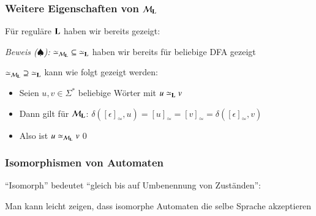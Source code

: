 \documentclass[aspectratio=1610,onlymath]{beamer}
\begin{document}
\begin{frame}[t]\frametitle{Weitere Eigenschaften von $\mathcal{M}_{\textbf{\textcolor{black}{L}}}$}

Für reguläre $\textbf{\textcolor{black}{L}}$ haben wir bereits gezeigt:
%
\medskip\pause

\emph{Beweis ($\spadesuit$):} ${\simeq_{\mathcal{M}_{\textbf{\textcolor{black}{L}}}}}\subseteq{\simeq_{\textbf{\textcolor{black}{L}}}}$ haben wir bereits für beliebige DFA gezeigt
\medskip

${\simeq_{\mathcal{M}_{\textbf{\textcolor{black}{L}}}}}\supseteq{\simeq_{\textbf{\textcolor{black}{L}}}}$ kann wie folgt gezeigt werden:
\begin{itemize}
\item Seien $u,v\in\Sigma^*$ beliebige Wörter mit $u\simeq_{\textbf{\textcolor{black}{L}}} v$
\item Dann gilt für $\mathcal{M}_{\textbf{\textcolor{black}{L}}}$: $\delta([\epsilon]_\simeq,u)=[u]_\simeq=[v]_\simeq=\delta([\epsilon]_\simeq,v)$
\item Also ist $u\simeq_{\mathcal{M}_{\textbf{\textcolor{black}{L}}}} v$\qed
\end{itemize}

\end{frame}

\begin{frame}\frametitle{Isomorphismen von Automaten}

"`Isomorph"' bedeutet "`gleich bis auf Umbenennung von Zuständen"':\bigskip

%
\bigskip

Man kann leicht zeigen, dass isomorphe Automaten die selbe Sprache akzeptieren
\bigskip


\end{frame}
\end{document}
